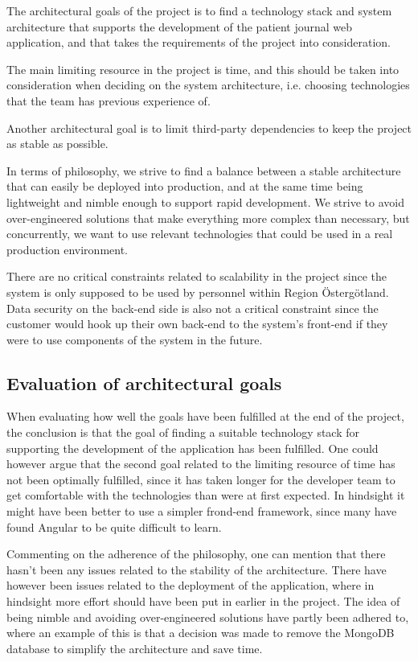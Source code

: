 \documentclass[10pt,a4paper]{article}
\begin{document}
The architectural goals of the project is to find a technology stack and system architecture that supports the development of the patient journal web application, and that takes the requirements of the project into consideration. 

The main limiting resource in the project is time, and this should be taken into consideration when deciding on the system architecture, i.e. choosing technologies that the team has previous experience of.

Another architectural goal is to limit third-party dependencies to keep the project as stable as possible.

In terms of philosophy, we strive to find a balance between a stable architecture that can easily be deployed into production, and at the same time being lightweight and nimble enough to support rapid development. We strive to avoid over-engineered solutions that make everything more complex than necessary, but concurrently, we want to use relevant technologies that could be used in a real production environment.

There are no critical constraints related to scalability in the project since the system is only supposed to be used by personnel within Region Östergötland. Data security on the back-end side is also not a critical constraint since the customer would hook up their own back-end to the system's front-end if they were to use components of the system in the future. 

\subsection{Evaluation of architectural goals}
When evaluating how well the goals have been fulfilled at the end of the project, the conclusion is that the goal of finding a suitable technology stack for supporting the development of the application has been fulfilled. One could however argue that the second goal related to the limiting resource of time has not been optimally fulfilled, since it has taken longer for the developer team to get comfortable with the technologies than were at first expected. In hindsight it might have been better to use a simpler frond-end framework, since many have found Angular to be quite difficult to learn.

Commenting on the adherence of the philosophy, one can mention that there hasn't been any issues related to the stability of the architecture. There have however been issues related to the deployment of the application, where in hindsight more effort should have been put in earlier in the project. The idea of being nimble and avoiding over-engineered solutions have partly been adhered to, where an example of this is that a decision was made to remove the MongoDB database to simplify the architecture and save time. 
\end{document}
